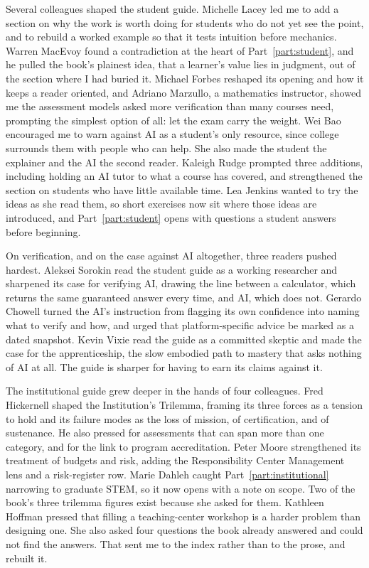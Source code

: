 \documentclass{SIAMbook2023}
\begin{document}
Several colleagues shaped the student guide. Michelle Lacey led me to add a section on why the work is worth doing for students who do not yet see the point, and to rebuild a worked example so that it tests intuition before mechanics. Warren MacEvoy found a contradiction at the heart of Part~\ref{part:student}, and he pulled the book's plainest idea, that a learner's value lies in judgment, out of the section where I had buried it. Michael Forbes reshaped its opening and how it keeps a reader oriented, and Adriano Marzullo, a mathematics instructor, showed me the assessment models asked more verification than many courses need, prompting the simplest option of all: let the exam carry the weight. Wei Bao encouraged me to warn against AI as a student's only resource, since college surrounds them with people who can help. She also made the student the explainer and the AI the second reader. Kaleigh Rudge prompted three additions, including holding an AI tutor to what a course has covered, and strengthened the section on students who have little available time. Lea Jenkins wanted to try the ideas as she read them, so short exercises now sit where those ideas are introduced, and Part~\ref{part:student} opens with questions a student answers before beginning.

On verification, and on the case against AI altogether, three readers pushed hardest. Aleksei Sorokin read the student guide as a working researcher and sharpened its case for verifying AI, drawing the line between a calculator, which returns the same guaranteed answer every time, and AI, which does not. Gerardo Chowell turned the AI's instruction from flagging its own confidence into naming what to verify and how, and urged that platform-specific advice be marked as a dated snapshot. Kevin Vixie read the guide as a committed skeptic and made the case for the apprenticeship, the slow embodied path to mastery that asks nothing of AI at all. The guide is sharper for having to earn its claims against it.

The institutional guide grew deeper in the hands of four colleagues. Fred Hickernell shaped the Institution's Trilemma, framing its three forces as a tension to hold and its failure modes as the loss of mission, of certification, and of sustenance. He also pressed for assessments that can span more than one category, and for the link to program accreditation. Peter Moore strengthened its treatment of budgets and risk, adding the Responsibility Center Management lens and a risk-register row. Marie Dahleh caught Part~\ref{part:institutional} narrowing to graduate STEM, so it now opens with a note on scope. Two of the book's three trilemma figures exist because she asked for them. Kathleen Hoffman pressed that filling a teaching-center workshop is a harder problem than designing one. She also asked four questions the book already answered and could not find the answers. That sent me to the index rather than to the prose, and rebuilt it.
\end{document}
